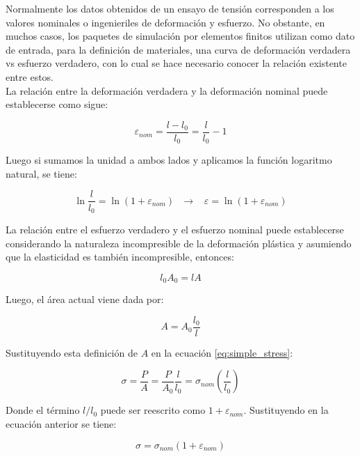 Normalmente los datos obtenidos de un ensayo de tensión corresponden a los valores nominales 
o ingenieriles de deformación y esfuerzo. No obstante, en muchos casos, los paquetes de simulación por 
elementos finitos utilizan como dato de entrada, para la definición de materiales, una curva de 
deformación verdadera vs esfuerzo verdadero, con lo cual se hace necesario conocer la 
relación existente entre estos.\\

La relación entre la deformación verdadera y la deformación nominal puede establecerse como sigue:

\begin{equation}
\varepsilon_{nom} = \frac{l - l_0}{l_0} = \frac{l}{l_0} - 1
\end{equation} 

Luego si sumamos la unidad a ambos lados y aplicamos la función logaritmo natural, se tiene:

\begin{equation}\label{eq:true_strain}
\ln{\frac{l}{l_0}} = \ln(1 + \varepsilon_{nom}) \,\,\,\,  \rightarrow \,\,\,\,\, 
\varepsilon = \ln(1 + \varepsilon_{nom}) 
\end{equation}

La relación entre el esfuerzo verdadero y el esfuerzo nominal puede establecerse considerando 
la naturaleza incompresible de la deformación plástica y asumiendo que la elasticidad es 
también incompresible, entonces:

\begin{equation}
l_0 A_0 = l A
\end{equation}

Luego, el área actual viene dada por:

\begin{equation}
A = A_0 \frac{l_0}{l}
\end{equation}

Sustituyendo esta definición de $A$ en la ecuación \ref{eq:simple_stress}:

\begin{equation}
\sigma = \frac{P}{A} = \frac{P}{A_0} \frac{l}{l_0} = \sigma_{nom} \left( \frac{l}{l_0} \right)
\end{equation}

Donde el término $l/l_0$  puede ser reescrito como $1 + \varepsilon_{nom}$. Sustituyendo 
en la ecuación anterior se tiene:

\begin{equation} \label{eq:true_stress}
\sigma = \sigma_{nom} ( 1 + \varepsilon_{nom} )
\end{equation}


